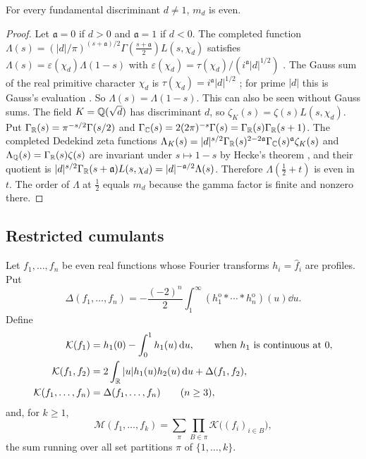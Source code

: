 \documentclass[11pt,colorlinks]{charlie}
\newcommand{\cM}{\mathcal{M}}
\newcommand{\Ka}{\mathcal{K}}
\newcommand{\ho}[1]{#1^{\mathrm{o}}}
\begin{document}
\begin{lemma}\label{lem:even}
For every fundamental discriminant $d\ne1$, $m_d$ is even.
\end{lemma}
\begin{proof}
Let $\mathfrak a=0$ if $d>0$ and $\mathfrak a=1$ if $d<0$. The completed function $\Lambda(s)=(|d|/\pi)^{(s+\mathfrak a)/2}\Gamma(\tfrac{s+\mathfrak a}2)L(s,\chi_d)$ satisfies $\Lambda(s)=\varepsilon(\chi_d)\Lambda(1-s)$ with $\varepsilon(\chi_d)=\tau(\chi_d)/(i^{\mathfrak a}|d|^{1/2})$ \cite[Ch.~9]{Davenport}. The Gauss sum of the real primitive character $\chi_d$ is $\tau(\chi_d)=i^{\mathfrak a}|d|^{1/2}$ \cite[Ch.~6]{Davenport}; for prime $|d|$ this is Gauss's evaluation \cite[Ch.~2]{Davenport}. So $\Lambda(s)=\Lambda(1-s)$. This can also be seen without Gauss sums. The field $K=\mathbb{Q}(\sqrt d)$ has discriminant $d$, so $\zeta_K(s)=\zeta(s)L(s,\chi_d)$. Put $\Gamma_{\mathbb{R}}(s)=\pi^{-s/2}\Gamma(s/2)$ and $\Gamma_{\mathbb{C}}(s)=2(2\pi)^{-s}\Gamma(s)=\Gamma_{\mathbb{R}}(s)\Gamma_{\mathbb{R}}(s+1)$. The completed Dedekind zeta functions $\Lambda_K(s)=|d|^{s/2}\Gamma_{\mathbb{R}}(s)^{2-2\mathfrak a}\Gamma_{\mathbb{C}}(s)^{\mathfrak a}\zeta_K(s)$ and $\Lambda_{\mathbb{Q}}(s)=\Gamma_{\mathbb{R}}(s)\zeta(s)$ are invariant under $s\mapsto1-s$ by Hecke's theorem \cite[Ch.~VII, \S5]{Neukirch}, and their quotient is $|d|^{s/2}\Gamma_{\mathbb{R}}(s+\mathfrak a)L(s,\chi_d)=|d|^{-\mathfrak a/2}\Lambda(s)$. Therefore $\Lambda(\tfrac12+t)$ is even in $t$. The order of $\Lambda$ at $\tfrac12$ equals $m_d$ because the gamma factor is finite and nonzero there.
\end{proof}

\subsection{Restricted cumulants}
\begin{definition}\label{def:cumulants}
Let $f_1,\dots,f_n$ be even real functions whose Fourier transforms $h_i=\widehat f_i$ are profiles. Put
\[
 \Delta(f_1,\dots,f_n)=-\frac{(-2)^n}{2}\int_1^\infty(\ho h_1*\cdots*\ho h_n)(u)\dd u .
\]
Define
\begin{align*}
 \Ka(f_1)&=h_1(0)-\int_0^1h_1(u)\dd u, \qquad\text{when $h_1$ is continuous at $0$},\\
 \Ka(f_1,f_2)&=2\int_\R|u|h_1(u)h_2(u)\dd u+\Delta(f_1,f_2),\\
 \Ka(f_1,\dots,f_n)&=\Delta(f_1,\dots,f_n)\qquad(n\ge3),
\end{align*}
and, for $k\ge1$,
\begin{equation}\label{eq:moment-cumulant}
 \cM(f_1,\dots,f_k)=\sum_{\pi}\prod_{B\in\pi}\Ka\big((f_i)_{i\in B}\big),
\end{equation}
the sum running over all set partitions $\pi$ of $\{1,\dots,k\}$.
\end{definition}
\end{document}
